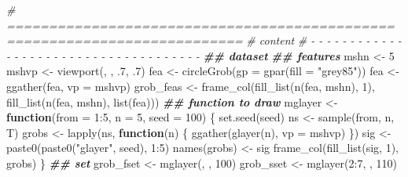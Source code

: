 \documentclass[
]{article}
\newenvironment{Shaded}{\begin{snugshade}}{\end{snugshade}}
\newcommand{\AttributeTok}[1]{\textcolor[rgb]{0.77,0.63,0.00}{#1}}
\newcommand{\CommentTok}[1]{\textcolor[rgb]{0.56,0.35,0.01}{\textit{#1}}}
\newcommand{\ControlFlowTok}[1]{\textcolor[rgb]{0.13,0.29,0.53}{\textbf{#1}}}
\newcommand{\DecValTok}[1]{\textcolor[rgb]{0.00,0.00,0.81}{#1}}
\newcommand{\DocumentationTok}[1]{\textcolor[rgb]{0.56,0.35,0.01}{\textbf{\textit{#1}}}}
\newcommand{\FunctionTok}[1]{\textcolor[rgb]{0.00,0.00,0.00}{#1}}
\newcommand{\NormalTok}[1]{#1}
\newcommand{\OtherTok}[1]{\textcolor[rgb]{0.56,0.35,0.01}{#1}}
\newcommand{\SpecialCharTok}[1]{\textcolor[rgb]{0.00,0.00,0.00}{#1}}
\newcommand{\StringTok}[1]{\textcolor[rgb]{0.31,0.60,0.02}{#1}}
\begin{document}
\begin{Shaded}
\begin{Highlighting}[]
\CommentTok{\# ==========================================================================}
\CommentTok{\# content}
\CommentTok{\# {-} {-} {-} {-} {-} {-} {-} {-} {-} {-} {-} {-} {-} {-} {-} {-} {-} {-} {-} {-} {-} {-} {-} {-} {-} {-} {-} {-} {-} {-} {-} {-} {-} {-} {-} {-} {-}}
\DocumentationTok{\#\# dataset}
\DocumentationTok{\#\# features}
\NormalTok{mshn }\OtherTok{\textless{}{-}} \DecValTok{5}
\NormalTok{mshvp }\OtherTok{\textless{}{-}} \FunctionTok{viewport}\NormalTok{(, , .}\DecValTok{7}\NormalTok{, .}\DecValTok{7}\NormalTok{)}
\NormalTok{fea }\OtherTok{\textless{}{-}} \FunctionTok{circleGrob}\NormalTok{(}\AttributeTok{gp =} \FunctionTok{gpar}\NormalTok{(}\AttributeTok{fill =} \StringTok{"grey85"}\NormalTok{))}
\NormalTok{fea }\OtherTok{\textless{}{-}} \FunctionTok{ggather}\NormalTok{(fea, }\AttributeTok{vp =}\NormalTok{ mshvp)}
\NormalTok{grob\_feas }\OtherTok{\textless{}{-}} \FunctionTok{frame\_col}\NormalTok{(}\FunctionTok{fill\_list}\NormalTok{(}\FunctionTok{n}\NormalTok{(fea, mshn), }\DecValTok{1}\NormalTok{), }\FunctionTok{fill\_list}\NormalTok{(}\FunctionTok{n}\NormalTok{(fea, mshn), }\FunctionTok{list}\NormalTok{(fea)))}
\DocumentationTok{\#\# function to draw}
\NormalTok{mglayer }\OtherTok{\textless{}{-}} \ControlFlowTok{function}\NormalTok{(}\AttributeTok{from =} \DecValTok{1}\SpecialCharTok{:}\DecValTok{5}\NormalTok{, }\AttributeTok{n =} \DecValTok{5}\NormalTok{, }\AttributeTok{seed =} \DecValTok{100}\NormalTok{) \{}
  \FunctionTok{set.seed}\NormalTok{(seed)}
\NormalTok{  ns }\OtherTok{\textless{}{-}} \FunctionTok{sample}\NormalTok{(from, n, T)}
\NormalTok{  grobs }\OtherTok{\textless{}{-}} \FunctionTok{lapply}\NormalTok{(ns, }\ControlFlowTok{function}\NormalTok{(n) \{}
                    \FunctionTok{ggather}\NormalTok{(}\FunctionTok{glayer}\NormalTok{(n), }\AttributeTok{vp =}\NormalTok{ mshvp)}
\NormalTok{         \})}
\NormalTok{  sig }\OtherTok{\textless{}{-}} \FunctionTok{paste0}\NormalTok{(}\FunctionTok{paste0}\NormalTok{(}\StringTok{"glayer"}\NormalTok{, seed), }\DecValTok{1}\SpecialCharTok{:}\DecValTok{5}\NormalTok{)}
  \FunctionTok{names}\NormalTok{(grobs) }\OtherTok{\textless{}{-}}\NormalTok{ sig}
  \FunctionTok{frame\_col}\NormalTok{(}\FunctionTok{fill\_list}\NormalTok{(sig, }\DecValTok{1}\NormalTok{), grobs)}
\NormalTok{\}}
\DocumentationTok{\#\# set}
\NormalTok{grob\_fset }\OtherTok{\textless{}{-}} \FunctionTok{mglayer}\NormalTok{(, , }\DecValTok{100}\NormalTok{)}
\NormalTok{grob\_sset }\OtherTok{\textless{}{-}} \FunctionTok{mglayer}\NormalTok{(}\DecValTok{2}\SpecialCharTok{:}\DecValTok{7}\NormalTok{, , }\DecValTok{110}\NormalTok{)}

\end{Highlighting}
\end{Shaded}
\end{document}
